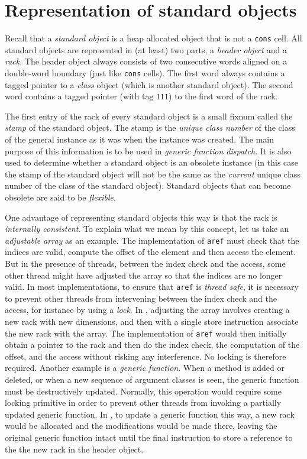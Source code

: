 \section{Representation of standard objects}
\label{sec-data-representation-standard-object}

Recall that a \emph{standard object} is a heap allocated object that
is not a \texttt{cons} cell.  All standard objects are represented in
(at least) two parts, a \emph{header object} and a \emph{rack}.  The
header object always consists of two consecutive words aligned on a
double-word boundary (just like \texttt{cons} cells).  The first word
always contains a tagged pointer to a \emph{class} object (which is
another standard object).  The second word contains a tagged pointer
(with tag $111$) to the first word of the rack.

The first entry of the rack of every standard object is a
small fixnum called the \emph{stamp} of the standard object.  The
stamp is the \emph{unique class number} of the class of the general
instance as it was when the instance was created.  The main purpose of
this information is to be used in \emph{generic function dispatch}.
It is also used to determine whether a standard object is an obsolete
instance (in this case the stamp of the standard object will not be
the same as the \emph{current} unique class number of the class of the
standard object).  Standard objects that can become obsolete are
said to be \emph{flexible}.

One advantage of representing standard objects this way is that the
rack is \emph{internally consistent}.  To explain what we
mean by this concept, let us take an \emph{adjustable array} as an
example.  The implementation of \texttt{aref} must check that the
indices are valid, compute the offset of the element and then access
the element.  But in the presence of threads, between the index check
and the access, some other thread might have adjusted the array so
that the indices are no longer valid.  In most implementations, to
ensure that \texttt{aref} is \emph{thread safe}, it is necessary to
prevent other threads from intervening between the index check and the
access, for instance by using a \emph{lock}.  In \sysname{}, adjusting
the array involves creating a new rack with new dimensions,
and then with a single store instruction associate the new rack
with the array.  The implementation of \texttt{aref} would then
initially obtain a pointer to the rack and then do the
index check, the computation of the offset, and the access without
risking any interference.  No locking is therefore required.  Another
example is a \emph{generic function}.  When a method is added or
deleted, or when a new sequence of argument classes is seen, the
generic function must be destructively updated.  Normally, this
operation would require some locking primitive in order to prevent
other threads from invoking a partially updated generic function.  In
\sysname{}, to update a generic function this way, a new rack
would be allocated and the modifications would be made there,
leaving the original generic function intact until the final
instruction to store a reference to the the new rack in the
header object.

